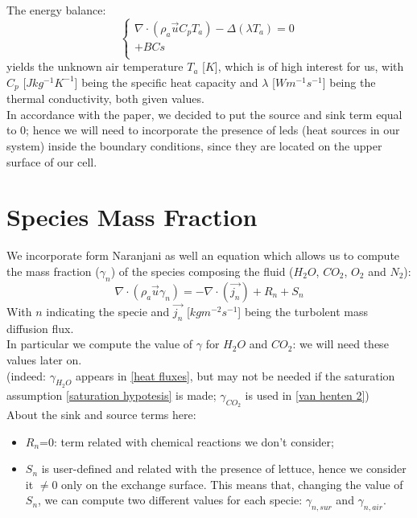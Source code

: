 The energy balance:
\begin{equation} \label{air energy balance}
	\begin{cases}		
	\nabla\cdot(\rho_a\vec{u} C_p T_a )-\Delta(\lambda T_a) = 0 \\
	+BCs\\
	\end{cases}
\end{equation}
yields the unknown air temperature $T_a$ [$K$], which is of high interest for us, with $C_p$ [$J kg^{-1} K^{-1}$] being the specific heat capacity and $\lambda$ [$W m^{-1} s^{-1}$] being the thermal conductivity, both given values.
\\
In accordance with the paper, we decided to put the source and sink term equal to 0; hence we will need to incorporate the presence of leds (heat sources in our system) inside the boundary conditions, since they are located on the upper surface of our cell.
\\
	
\section{Species Mass Fraction}
We incorporate form Naranjani as well an equation which allows us to compute the mass fraction ($\gamma_n$) of the species composing the fluid ($H_2O$, $CO_2$, $O_2$ and $N_2$):
\begin{equation} \label{air mass fractions}
	\nabla\cdot(\rho_a\vec{u}\gamma_n) = - \nabla\cdot(\vec{j_n}) + R_n + S_n
\end{equation}
With $n$ indicating the specie and $\vec{j_n}$ [$kg m^{-2} s^{-1}$] being the turbolent mass diffusion flux. \\
In particular we compute the value of $\gamma$ for $H_2O$ and $CO_2$: we will need these values later on.\\
(indeed: $\gamma_{H_2O}$ appears in \eqref{heat fluxes}, but may not be needed if the saturation assumption \eqref{saturation hypotesis} is made; $\gamma_{CO_2}$ is used in \eqref{van henten 2})\\
About the sink and source terms here:
\begin{itemize}
	\item $R_n$=0: term related with chemical reactions we don't consider;
	\item $S_n$ is user-defined and related with the presence of lettuce, hence we consider it $\neq0$ only on the exchange surface. This means that, changing the value of $S_n$, we can compute two different values for each specie: $\gamma_{n,sur}$ and $\gamma_{n,air}$.
\end{itemize}

